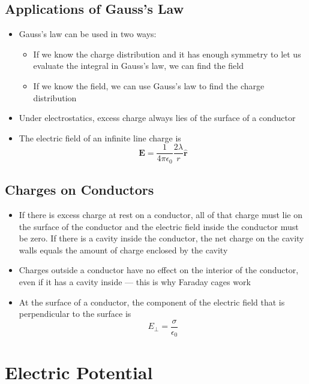 \documentclass{article}
\newcommand{\ke}{\frac{1}{4 \pi \epsilon_0}}
\begin{document}
\subsection{Applications of Gauss's Law}

\begin{itemize}
  \item Gauss's law can be used in two ways:

        \begin{itemize}
          \item If we know the charge distribution and it has enough symmetry to let us evaluate the integral in Gauss's law, we can find the field

          \item If we know the field, we can use Gauss's law to find the charge distribution
        \end{itemize}

  \item Under electrostatics, excess charge always lies of the surface of a conductor

  \item The electric field of an infinite line charge is \[\mathbf{E} = \ke \frac{2 \lambda}{r} \hat{\mathbf{r}}\]
\end{itemize}

\subsection{Charges on Conductors}

\begin{itemize}
  \item If there is excess charge at rest on a conductor, all of that charge must lie on the surface of the conductor and the electric field inside the conductor must be zero. If there is a cavity inside the conductor, the net charge on the cavity walls equals the amount of charge enclosed by the cavity

  \item Charges outside a conductor have no effect on the interior of the conductor, even if it has a cavity inside — this is why Faraday cages work

  \item At the surface of a conductor, the component of the electric field that is perpendicular to the surface is \[E_\perp = \frac{\sigma}{\epsilon_0}\]
\end{itemize}

\section{Electric Potential}
\end{document}
